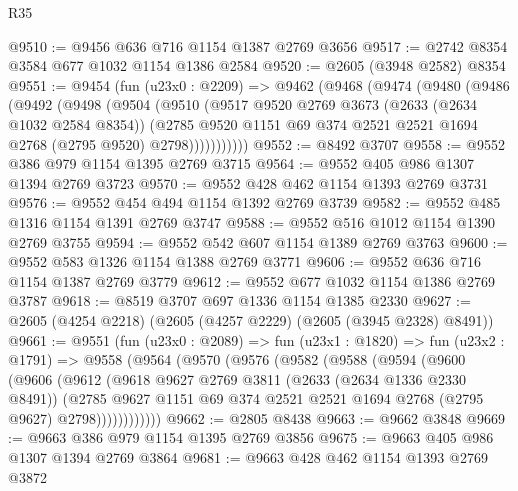\begin{lexlean}{R35}
\begin{coremodule}
@9510 := @9456 @636 @716 @1154 @1387 @2769 @3656
@9517 := @2742 @8354 @3584 @677 @1032 @1154 @1386 @2584
@9520 := @2605 (@3948 @2582) @8354
@9551 := @9454
    (fun (u23x0 : @2209) =>
    @9462
      (@9468
        (@9474
          (@9480
            (@9486
              (@9492
                (@9498
                  (@9504
                    (@9510
                      (@9517
                        @9520
                        @2769
                        @3673
                        (@2633 (@2634 @1032 @2584 @8354))
                        (@2785
                          @9520
                          @1151
                          @69
                          @374
                          @2521
                          @2521
                          @1694
                          @2768
                          (@2795 @9520)
                          @2798)))))))))))
@9552 := @8492 @3707
@9558 := @9552 @386 @979 @1154 @1395 @2769 @3715
@9564 := @9552 @405 @986 @1307 @1394 @2769 @3723
@9570 := @9552 @428 @462 @1154 @1393 @2769 @3731
@9576 := @9552 @454 @494 @1154 @1392 @2769 @3739
@9582 := @9552 @485 @1316 @1154 @1391 @2769 @3747
@9588 := @9552 @516 @1012 @1154 @1390 @2769 @3755
@9594 := @9552 @542 @607 @1154 @1389 @2769 @3763
@9600 := @9552 @583 @1326 @1154 @1388 @2769 @3771
@9606 := @9552 @636 @716 @1154 @1387 @2769 @3779
@9612 := @9552 @677 @1032 @1154 @1386 @2769 @3787
@9618 := @8519 @3707 @697 @1336 @1154 @1385 @2330
@9627 := @2605 (@4254 @2218) (@2605 (@4257 @2229) (@2605 (@3945 @2328) @8491))
@9661 := @9551
    (fun (u23x0 : @2089) =>
    fun (u23x1 : @1820) =>
    fun (u23x2 : @1791) =>
    @9558
      (@9564
        (@9570
          (@9576
            (@9582
              (@9588
                (@9594
                  (@9600
                    (@9606
                      (@9612
                        (@9618
                          @9627
                          @2769
                          @3811
                          (@2633 (@2634 @1336 @2330 @8491))
                          (@2785
                            @9627
                            @1151
                            @69
                            @374
                            @2521
                            @2521
                            @1694
                            @2768
                            (@2795 @9627)
                            @2798))))))))))))
@9662 := @2805 @8438
@9663 := @9662 @3848
@9669 := @9663 @386 @979 @1154 @1395 @2769 @3856
@9675 := @9663 @405 @986 @1307 @1394 @2769 @3864
@9681 := @9663 @428 @462 @1154 @1393 @2769 @3872

\end{coremodule}
\end{lexlean}
